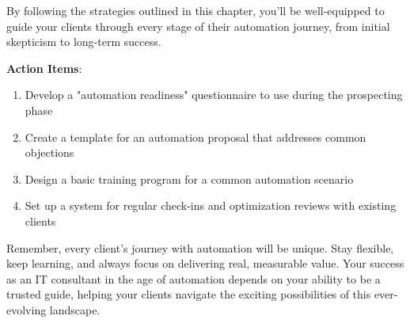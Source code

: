 By following the strategies outlined in this chapter, you'll be well-equipped to guide your clients through every stage of their automation journey, from initial skepticism to long-term success.

\textbf{Action Items}:
\begin{enumerate}
    \item Develop a "automation readiness" questionnaire to use during the prospecting phase
    \item Create a template for an automation proposal that addresses common objections
    \item Design a basic training program for a common automation scenario
    \item Set up a system for regular check-ins and optimization reviews with existing clients
\end{enumerate}

Remember, every client's journey with automation will be unique. Stay flexible, keep learning, and always focus on delivering real, measurable value. Your success as an IT consultant in the age of automation depends on your ability to be a trusted guide, helping your clients navigate the exciting possibilities of this ever-evolving landscape.

